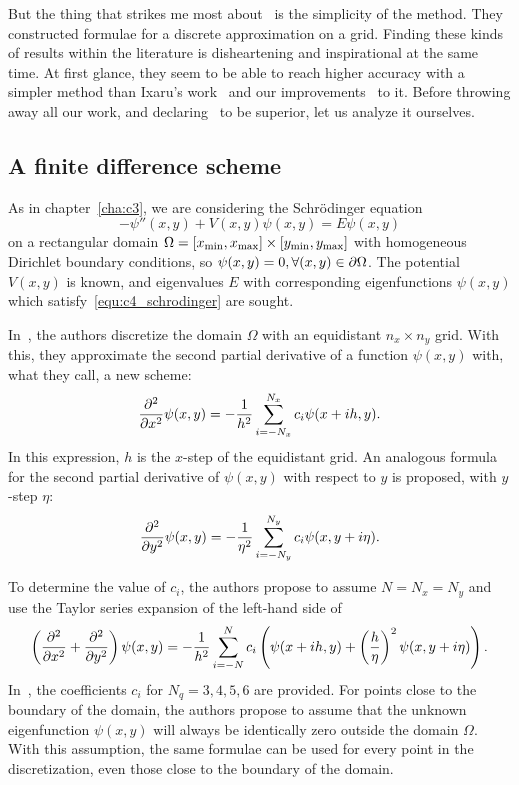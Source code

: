 But the thing that strikes me most about~\cite{wang_new_2009} is the simplicity of the method. They constructed formulae for a discrete approximation on a grid. Finding these kinds of results within the literature is disheartening and inspirational at the same time. At first glance, they seem to be able to reach higher accuracy with a simpler method than Ixaru's work~\cite{ixaru_new_2010} and our improvements~\cite{baeyens_improvements_2022} to it. Before throwing away all our work, and declaring~\cite{wang_new_2009} to be superior, let us analyze it ourselves.

\subsection{A finite difference scheme}\label{sec:c4_fd_scheme}

As in chapter~\ref{cha:c3}, we are considering the Schrödinger equation
\begin{equation}\label{equ:c4_schrodinger}
    -\psi''(x, y) + V(x, y) \psi(x, y) = E\psi(x, y)
\end{equation}
on a rectangular domain $\Omega = [{x_{\text{min}}}, {x_{\text{max}}}] \times [{y_{\text{min}}}, {y_{\text{max}}}]$ with homogeneous Dirichlet boundary conditions, so $\psi(x, y) = 0, \forall (x, y) \in \partial\Omega$. The potential $V(x, y)$ is known, and eigenvalues $E$ with corresponding eigenfunctions $\psi(x, y)$ which satisfy~\eqref{equ:c4_schrodinger} are sought.

In~\cite{wang_new_2009}, the authors discretize the domain $\Omega$ with an equidistant $n_x \times n_y$ grid. With this, they approximate the second partial derivative of a function $\psi(x, y)$ with, what they call, a new scheme:
$$
    {\pdv[2]{}{x}}\psi(x, y) = -\frac{1}{h^2}\sum_{i=-N_x}^{N_x} c_i \psi(x + ih, y)\text{.}
$$
In this expression, $h$ is the $x$-step of the equidistant grid. An analogous formula for the second partial derivative of $\psi(x, y)$ with respect to $y$ is proposed, with $y$-step $\eta$:
$$
    {\pdv[2]{}{y}}\psi(x, y) = -\frac{1}{\eta^2}\sum_{i=-N_y}^{N_y} c_i \psi(x, y + i\eta)\text{.}
$$

To determine the value of $c_i$, the authors propose to assume $N = N_x = N_y$ and use the Taylor series expansion of the left-hand side of
$$
    \left({\pdv[2]{}{x}} + {\pdv[2]{}{y}}\right)\psi(x, y) = -\frac{1}{h^2} \sum_{i=-N}^{N} c_i \left(\psi(x+ih, y) + \left(\frac{h}{\eta}\right)^2\psi(x, y+i\eta)\right)\text{.}
$$
In~\cite{wang_new_2009}, the coefficients $c_i$ for $N_q = 3, 4, 5, 6$ are provided. For points close to the boundary of the domain, the authors propose to assume that the unknown eigenfunction $\psi(x, y)$ will always be identically zero outside the domain $\Omega$. With this assumption, the same formulae can be used for every point in the discretization, even those close to the boundary of the domain.

